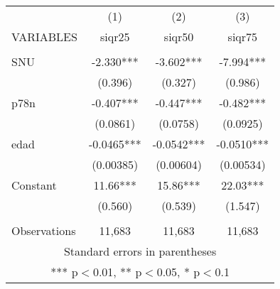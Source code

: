 \begin{tabular}{lccc} \hline
 & (1) & (2) & (3) \\
VARIABLES & siqr25 & siqr50 & siqr75 \\ \hline
 &  &  &  \\
SNU & -2.330*** & -3.602*** & -7.994*** \\
 & (0.396) & (0.327) & (0.986) \\
p78n & -0.407*** & -0.447*** & -0.482*** \\
 & (0.0861) & (0.0758) & (0.0925) \\
edad & -0.0465*** & -0.0542*** & -0.0510*** \\
 & (0.00385) & (0.00604) & (0.00534) \\
Constant & 11.66*** & 15.86*** & 22.03*** \\
 & (0.560) & (0.539) & (1.547) \\
 &  &  &  \\
 Observations & 11,683 & 11,683 & 11,683 \\ \hline
\multicolumn{4}{c}{ Standard errors in parentheses} \\
\multicolumn{4}{c}{ *** p$<$0.01, ** p$<$0.05, * p$<$0.1} \\
\end{tabular}
